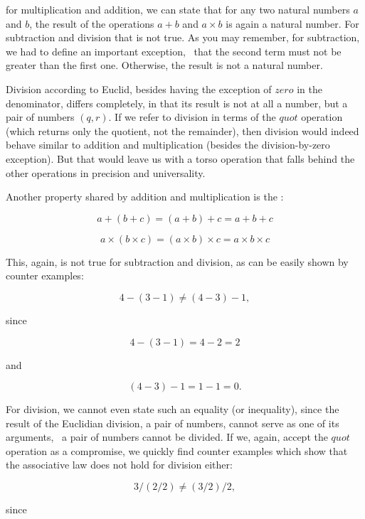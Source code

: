 \documentclass{scrreprt}
\newcommand{\Varid}[1]{\mathit{#1}}
\begin{document}
for multiplication and addition, we can state that
for any two natural numbers $a$ and $b$,
the result of the operations $a + b$ and
$a \times b$ is again a natural number.
For subtraction and division that is not true.
As you may remember, for subtraction, 
we had to define an important exception,
\viz\ that the second term must not be
greater than the first one.
Otherwise, the result is not a natural number.

Division according to Euclid, 
besides having the exception of \ensuremath{\Varid{zero}}  
in the denominator, differs completely,
in that its result is not at all a number,
but a pair of numbers $(q,r)$.
If we refer to division 
in terms of the \ensuremath{\Varid{quot}} operation 
(which returns only the quotient, not the remainder),
then division would indeed behave
similar to addition and multiplication
(besides the division-by-zero exception).
But that would leave us with a torso operation
that falls behind the other operations 
in precision and universality.

Another property shared by addition and multiplication
is the :

\begin{equation}
a + (b + c) = (a + b) + c = a + b + c
\end{equation}

\begin{equation}
a \times (b \times c) = (a \times b) \times c = a \times b \times c
\end{equation}

This, again, is not true for subtraction and division,
as can be easily shown by counter examples:

\[
4 - (3 - 1) \neq (4 - 3) - 1, 
\]

since

\[
4 - (3 - 1) = 4 - 2 = 2
\]

and

\[
(4 - 3) - 1 = 1 - 1 = 0.
\]

For division, we cannot even state such an equality
(or inequality), since the result of the Euclidian division,
a pair of numbers, cannot serve as one of its arguments, \ie\
a pair of numbers cannot be divided.
If we, again, accept the \ensuremath{\Varid{quot}} operation as a compromise,
we quickly find counter examples which show
that the associative law does not hold for division either:

\[
3 / (2 / 2) \neq (3 / 2) / 2,
\]

since 
\end{document}
